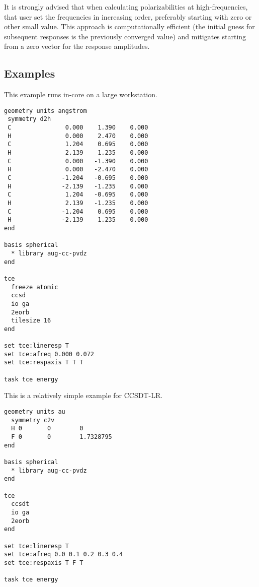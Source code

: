It is strongly advised that when calculating polarizabilities at high-frequencies, that user set the frequencies in increasing order, preferably starting with zero or other small value.  This approach is computationally efficient (the initial guess for subsequent responses is the previously converged value) and mitigates starting from a zero vector for the response amplitudes.

\subsection{Examples}

This example runs in-core on a large workstation.

\begin{verbatim}
geometry units angstrom
 symmetry d2h
 C               0.000    1.390    0.000
 H               0.000    2.470    0.000
 C               1.204    0.695    0.000
 H               2.139    1.235    0.000
 C               0.000   -1.390    0.000
 H               0.000   -2.470    0.000
 C              -1.204   -0.695    0.000
 H              -2.139   -1.235    0.000
 C               1.204   -0.695    0.000
 H               2.139   -1.235    0.000
 C              -1.204    0.695    0.000
 H              -2.139    1.235    0.000
end

basis spherical
  * library aug-cc-pvdz
end

tce
  freeze atomic
  ccsd
  io ga
  2eorb
  tilesize 16
end

set tce:lineresp T
set tce:afreq 0.000 0.072
set tce:respaxis T T T

task tce energy
\end{verbatim}

This is a relatively simple example for CCSDT-LR.

\begin{verbatim}
geometry units au
  symmetry c2v
  H 0       0        0
  F 0       0        1.7328795
end

basis spherical
  * library aug-cc-pvdz
end

tce
  ccsdt
  io ga
  2eorb
end

set tce:lineresp T
set tce:afreq 0.0 0.1 0.2 0.3 0.4
set tce:respaxis T F T

task tce energy
\end{verbatim}
